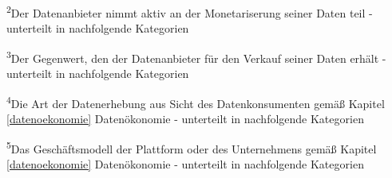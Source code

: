 \noindent \textsuperscript{2}Der Datenanbieter nimmt aktiv an der Monetariserung seiner Daten teil - unterteilt in nachfolgende Kategorien \newline

\noindent \textsuperscript{3}Der Gegenwert, den der Datenanbieter für den Verkauf seiner Daten erhält - unterteilt in nachfolgende Kategorien \newline

\noindent \textsuperscript{4}Die Art der Datenerhebung aus Sicht des Datenkonsumenten gemäß Kapitel \ref{datenoekonomie} Datenökonomie - unterteilt in nachfolgende Kategorien \newline

\noindent \textsuperscript{5}Das Geschäftsmodell der Plattform oder des Unternehmens gemäß Kapitel \ref{datenoekonomie} Datenökonomie - unterteilt in nachfolgende Kategorien\newline